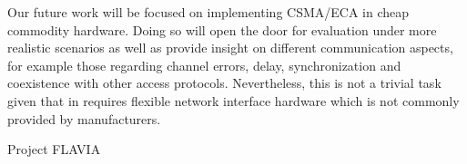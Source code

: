 Our future work will be focused on implementing CSMA/ECA in cheap commodity hardware. Doing so will open the door for evaluation under more realistic scenarios as well as provide insight on different communication aspects, for example those regarding channel errors, delay, synchronization and coexistence with other access protocols. Nevertheless, this is not a trivial task given that in requires flexible network interface hardware which is not commonly provided by manufacturers. 

Project FLAVIA~\cite{FLAVIA}